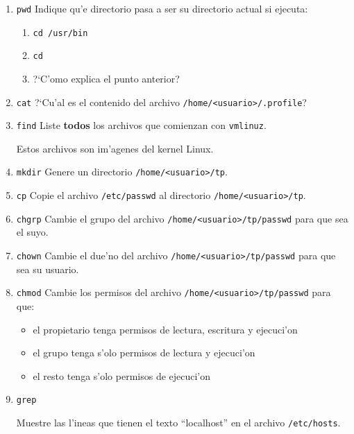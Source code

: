 \begin{enumerate}

\item \texttt{pwd} Indique qu'e directorio pasa a ser su directorio actual si ejecuta:

\begin{enumerate}
\item \texttt{cd /usr/bin}
\item \texttt{cd}
\item ?`C'omo explica el punto anterior?
\end{enumerate}

\item \texttt{cat} ?`Cu'al es el contenido del archivo \texttt{/home/<usuario>/.profile}?

\item \texttt{find} Liste \textbf{todos} los archivos que comienzan con \texttt{vmlinuz}.

Estos archivos son im'agenes del kernel Linux.

\item \texttt{mkdir} Genere un directorio \texttt{/home/<usuario>/tp}.

\item \texttt{cp} Copie el archivo \texttt{/etc/passwd} al directorio \texttt{/home/<usuario>/tp}.

\item \texttt{chgrp} Cambie el grupo del archivo \texttt{/home/<usuario>/tp/passwd} para que sea el suyo.

\item \texttt{chown} Cambie el due'no del archivo \texttt{/home/<usuario>/tp/passwd} para que sea su usuario.

\item \texttt{chmod} Cambie los permisos del archivo \texttt{/home/<usuario>/tp/passwd} para que:

\begin{itemize}
\item el propietario tenga permisos de lectura, escritura y ejecuci'on
\item el grupo tenga s'olo permisos de lectura y ejecuci'on
\item el resto tenga s'olo permisos de ejecuci'on
\end{itemize}

\item \texttt{grep}

Muestre las l'ineas que tienen el texto ``localhost'' en el archivo \texttt{/etc/hosts}.


\end{enumerate}
